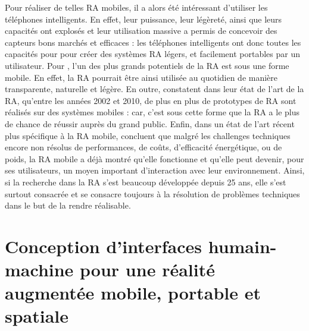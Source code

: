 Pour réaliser de telles RA mobiles, il a alors été intéressant d'utiliser les téléphones intelligents. En effet, leur puissance, leur légèreté, ainsi que leurs capacités ont explosés et leur utilisation massive a permis de concevoir des capteurs bons marchés et efficaces : les téléphones intelligents ont donc toutes les capacités pour pour créer des systèmes RA légers, et facilement portables par un utilisateur. \citep{ZhouDuhBillinghurst2008} \citep{DeSaChurchill2013} Pour \citet{VanKrevelenPoelman2010}, l'un des plus grands potentiels de la RA est sous une forme mobile. En effet, la RA pourrait être ainsi utilisée au quotidien de manière transparente, naturelle et légère. En outre, \citet{CarmignianiFurhtAnisettiEtAl2011} constatent dans leur état de l'art de la RA, qu'entre les années 2002 et 2010, de plus en plus de prototypes de RA sont réalisés sur des systèmes mobiles : car, c'est sous cette forme que la RA a le plus de chance de réussir auprès du grand public. Enfin, dans un état de l'art récent plus spécifique à la RA mobile, \citet{HuangHuiPeyloEtAl2013} concluent que malgré les challenges techniques encore non résolus de performances, de coûts, d'efficacité énergétique, ou de poids, la RA mobile a déjà montré qu'elle fonctionne et qu'elle peut devenir, pour ses utilisateurs, un moyen important d’interaction avec leur environnement. Ainsi, si la recherche dans la RA s'est beaucoup développée depuis 25 ans, elle s'est surtout consacrée et se consacre toujours à la résolution de problèmes techniques dans le but de la rendre réalisable.



\section{Conception d'interfaces humain-machine pour une réalité augmentée mobile, portable et spatiale}
